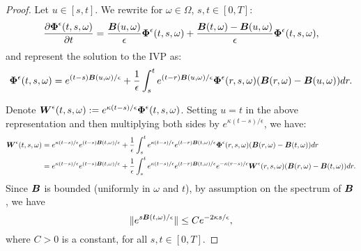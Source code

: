 \begin{proof}
Let $u \in [s,t]$. We rewrite for $\omega \in \Omega$, $s, t \in [0,T]$:
\begin{equation}
\frac{\partial \boldsymbol{\Phi}^\epsilon(t,s,\omega)}{\partial t} =  \frac{\boldsymbol{B}(u,\omega)}{\epsilon} \boldsymbol{\Phi}^\epsilon(t,s,\omega) + \frac{\boldsymbol{B}(t,\omega)-\boldsymbol{B}(u,\omega)}{\epsilon} \boldsymbol{\Phi}^\epsilon(t,s,\omega),
\end{equation} 
and represent the solution to the IVP as:
\begin{equation}
\boldsymbol{\Phi}^\epsilon(t,s,\omega) = e^{(t-s)\boldsymbol{B}(u,\omega)/\epsilon} + \frac{1}{\epsilon} \int_s^t e^{(t-r) \boldsymbol{B}(u,\omega)/\epsilon} \boldsymbol{\Phi}^\epsilon(r,s,\omega) (\boldsymbol{B}(r,\omega)-\boldsymbol{B}(u,\omega)) dr.
\end{equation}

Denote $\boldsymbol{W}^\epsilon(t,s,\omega) := e^{\kappa(t-s)/\epsilon} \boldsymbol{\Phi}^\epsilon(t,s,\omega)$.
Setting $u = t$ in the above representation and then multiplying both sides by $e^{\kappa(t-s)/\epsilon}$, we have:
\begin{align}
\boldsymbol{W}^\epsilon(t,s,\omega) &= e^{\kappa(t-s)/\epsilon} e^{(t-s)\boldsymbol{B}(t,\omega)/\epsilon} + \frac{1}{\epsilon} \int_s^t e^{\kappa(t-s)/\epsilon} e^{(t-r) \boldsymbol{B}(t,\omega)/\epsilon} \boldsymbol{\Phi}^\epsilon(r,s,\omega) (\boldsymbol{B}(r,\omega)-\boldsymbol{B}(t,\omega)) dr \\ 
&= e^{\kappa(t-s)/\epsilon} e^{(t-s)\boldsymbol{B}(t,\omega)/\epsilon} + \frac{1}{\epsilon} \int_s^t e^{\kappa(t-s)/\epsilon} e^{(t-r) \boldsymbol{B}(t,\omega)/\epsilon} e^{-\kappa(r-s)/\epsilon} \boldsymbol{W}^\epsilon(r,s,\omega) (\boldsymbol{B}(r,\omega)-\boldsymbol{B}(t,\omega)) dr. 
\end{align}
Since $\boldsymbol{B}$ is bounded (uniformly in $\omega$ and $t$), by assumption on the spectrum of $\boldsymbol{B}$, we have 
\begin{equation}\|e^{s \boldsymbol{B}(t,\omega)/\epsilon}\| \leq C e^{-2\kappa s/\epsilon},
\end{equation}
where $C>0$ is a constant, for all $s,t \in [0,T]$. 


\end{proof}
